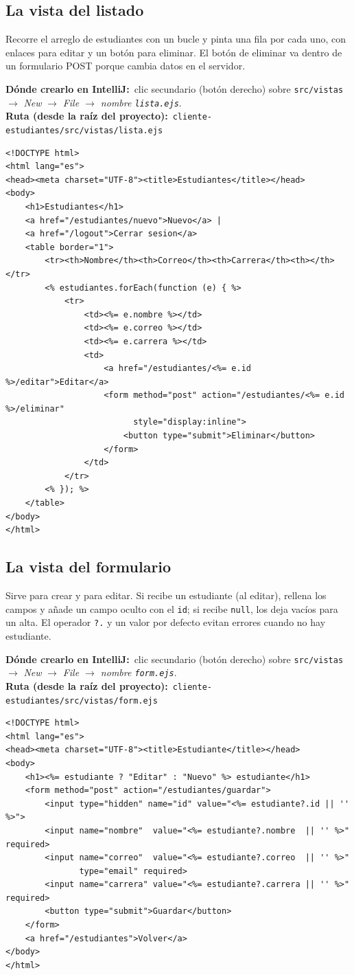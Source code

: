 \documentclass[11pt]{article}
\newcommand{\dondecrear}[3]{\begin{ubic}{\footnotesize\textbf{\color{ndverdeo}D\'onde crearlo en IntelliJ:}~clic secundario (bot\'on derecho) sobre \texttt{#1} $\rightarrow$ \emph{New} $\rightarrow$ \emph{#2}.\\[2pt]\textbf{\color{ndverdeo}Ruta (desde la ra\'iz del proyecto):}~\texttt{#3}}\end{ubic}\nobreak\vspace{3pt}}
\begin{document}
\subsection{La vista del listado}
Recorre el arreglo de estudiantes con un bucle y pinta una fila por cada uno, con enlaces para editar y un botón para eliminar. El botón de eliminar va dentro de un formulario POST porque cambia datos en el servidor.

\dondecrear{src/vistas}{File $\rightarrow$ nombre \texttt{lista.ejs}}{cliente-estudiantes/src/vistas/lista.ejs}
\begin{cajacodigo}
\begin{lstlisting}[style=markup]
<!DOCTYPE html>
<html lang="es">
<head><meta charset="UTF-8"><title>Estudiantes</title></head>
<body>
	<h1>Estudiantes</h1>
	<a href="/estudiantes/nuevo">Nuevo</a> |
	<a href="/logout">Cerrar sesion</a>
	<table border="1">
		<tr><th>Nombre</th><th>Correo</th><th>Carrera</th><th></th></tr>
		<% estudiantes.forEach(function (e) { %>
			<tr>
				<td><%= e.nombre %></td>
				<td><%= e.correo %></td>
				<td><%= e.carrera %></td>
				<td>
					<a href="/estudiantes/<%= e.id %>/editar">Editar</a>
					<form method="post" action="/estudiantes/<%= e.id %>/eliminar"
					      style="display:inline">
						<button type="submit">Eliminar</button>
					</form>
				</td>
			</tr>
		<% }); %>
	</table>
</body>
</html>
\end{lstlisting}
\end{cajacodigo}
\vspace{2pt}

\subsection{La vista del formulario}
Sirve para crear y para editar. Si recibe un estudiante (al editar), rellena los campos y añade un campo oculto con el \texttt{id}; si recibe \texttt{null}, los deja vacíos para un alta. El operador \texttt{?.} y un valor por defecto evitan errores cuando no hay estudiante.

\dondecrear{src/vistas}{File $\rightarrow$ nombre \texttt{form.ejs}}{cliente-estudiantes/src/vistas/form.ejs}
\begin{cajacodigo}
\begin{lstlisting}[style=markup]
<!DOCTYPE html>
<html lang="es">
<head><meta charset="UTF-8"><title>Estudiante</title></head>
<body>
	<h1><%= estudiante ? "Editar" : "Nuevo" %> estudiante</h1>
	<form method="post" action="/estudiantes/guardar">
		<input type="hidden" name="id" value="<%= estudiante?.id || '' %>">
		<input name="nombre"  value="<%= estudiante?.nombre  || '' %>" required>
		<input name="correo"  value="<%= estudiante?.correo  || '' %>"
		       type="email" required>
		<input name="carrera" value="<%= estudiante?.carrera || '' %>" required>
		<button type="submit">Guardar</button>
	</form>
	<a href="/estudiantes">Volver</a>
</body>
</html>
\end{lstlisting}
\end{cajacodigo}
\vspace{2pt}
\end{document}
